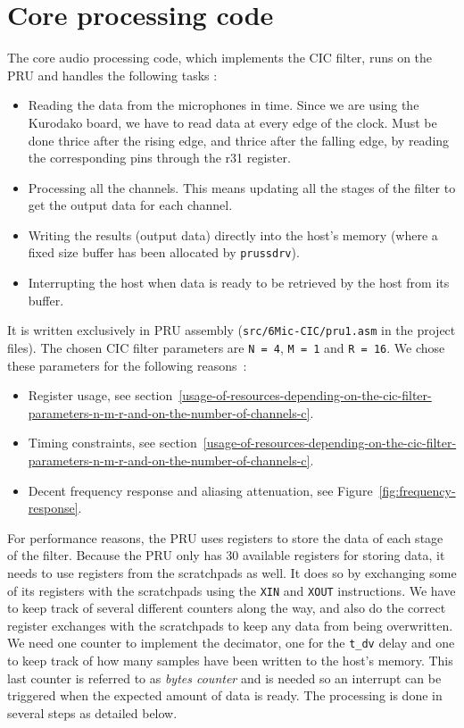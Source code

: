 \documentclass[]{report}
\providecommand{\tightlist}{%
	\setlength{\itemsep}{0pt}\setlength{\parskip}{0pt}}
\begin{document}
\hypertarget{core-processing-code}{%
\section{Core processing code}\label{core-processing-code}}

The core audio processing code, which implements the CIC filter, runs on the PRU and handles the following tasks :

\begin{itemize}
\tightlist
\item
  Reading the data from the microphones in time. Since we are using the Kurodako board, we have to read data at every edge of the clock. Must be done thrice after the rising edge, and thrice after the falling edge, by reading the corresponding pins through the r31 register.
\item
  Processing all the channels. This means updating all the stages of the filter to get the output data for each channel.
\item
  Writing the results (output data) directly into the host's memory (where a fixed size buffer has been allocated by \texttt{prussdrv}).
\item
  Interrupting the host when data is ready to be retrieved by the host from its buffer.
\end{itemize}

It is written exclusively in PRU assembly (\texttt{src/6Mic-CIC/pru1.asm} in the project files). The chosen CIC filter parameters are \texttt{N~=~4}, \texttt{M = 1} and \texttt{R = 16}. We chose these parameters for the following reasons~:

\begin{itemize}
  \tightlist
  \item Register usage, see section~\ref{usage-of-resources-depending-on-the-cic-filter-parameters-n-m-r-and-on-the-number-of-channels-c}.
  \item Timing constraints, see section~\ref{usage-of-resources-depending-on-the-cic-filter-parameters-n-m-r-and-on-the-number-of-channels-c}.
  \item Decent frequency response and aliasing attenuation, see Figure~\ref{fig:frequency-response}.
\end{itemize}

For performance reasons, the PRU uses registers to store the data of each stage of the filter. Because the PRU only has 30 available registers for storing data, it needs to use registers from the scratchpads as well. It does so by exchanging some of its registers with the scratchpads using the \texttt{XIN} and \texttt{XOUT} instructions. We have to keep track of several different counters along the way, and also do the correct register exchanges with the scratchpads to keep any data from being overwritten. We need one counter to implement the decimator, one for the \texttt{t\_dv} delay and one to keep track of how many samples have been written to the host's memory. This last counter is referred to as \emph{bytes counter} and is needed so an interrupt can be triggered when the expected amount of data is ready. The processing is done in several steps as detailed below.
\end{document}
